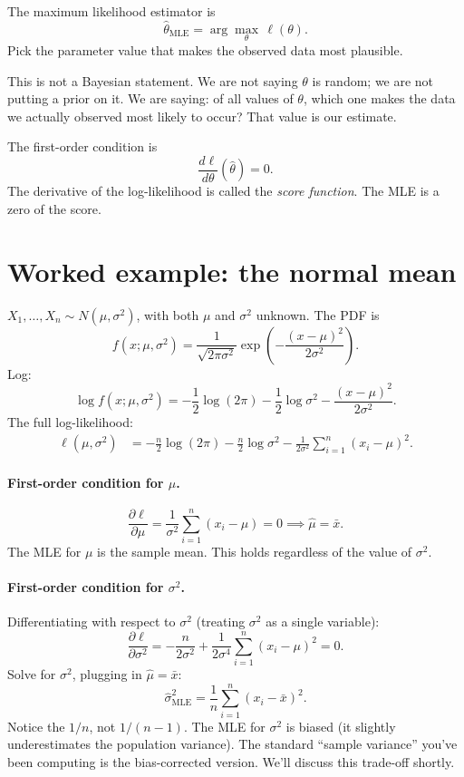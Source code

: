 The maximum likelihood estimator is
\begin{equation}
  \hat\theta_{\text{MLE}} = \arg\max_\theta \, \ell(\theta).
\end{equation}
Pick the parameter value that makes the observed data most plausible.

This is not a Bayesian statement. We are not saying $\theta$ is random; we are not putting a prior on it. We are saying: of all values of $\theta$, which one makes the data we actually observed most likely to occur? That value is our estimate.

The first-order condition is
\begin{equation}
  \frac{d\ell}{d\theta}(\hat\theta) = 0.
  \label{eq:score-equation}
\end{equation}
The derivative of the log-likelihood is called the \emph{score function}. The MLE is a zero of the score.

\section{Worked example: the normal mean}

$X_1, \ldots, X_n \sim N(\mu, \sigma^2)$, with both $\mu$ and $\sigma^2$ unknown. The PDF is
\[
  f(x; \mu, \sigma^2) = \frac{1}{\sqrt{2\pi\sigma^2}} \exp\!\left(-\frac{(x - \mu)^2}{2\sigma^2}\right).
\]
Log:
\[
  \log f(x; \mu, \sigma^2) = -\frac{1}{2}\log(2\pi) - \frac{1}{2}\log\sigma^2 - \frac{(x - \mu)^2}{2\sigma^2}.
\]
The full log-likelihood:
\begin{align}
  \ell(\mu, \sigma^2)
    &= -\frac{n}{2}\log(2\pi) - \frac{n}{2}\log\sigma^2 - \frac{1}{2\sigma^2}\sum_{i=1}^{n}(x_i - \mu)^2.
\end{align}

\paragraph{First-order condition for $\mu$.}
\[
  \frac{\partial \ell}{\partial \mu} = \frac{1}{\sigma^2}\sum_{i=1}^{n}(x_i - \mu) = 0 \implies \hat\mu = \bar{x}.
\]
The MLE for $\mu$ is the sample mean. This holds regardless of the value of $\sigma^2$.

\paragraph{First-order condition for $\sigma^2$.} Differentiating with respect to $\sigma^2$ (treating $\sigma^2$ as a single variable):
\[
  \frac{\partial \ell}{\partial \sigma^2} = -\frac{n}{2\sigma^2} + \frac{1}{2\sigma^4}\sum_{i=1}^{n}(x_i - \mu)^2 = 0.
\]
Solve for $\sigma^2$, plugging in $\hat\mu = \bar{x}$:
\[
  \hat\sigma^2_{\text{MLE}} = \frac{1}{n}\sum_{i=1}^{n}(x_i - \bar{x})^2.
\]
Notice the $1/n$, not $1/(n-1)$. The MLE for $\sigma^2$ is biased (it slightly underestimates the population variance). The standard ``sample variance'' you've been computing is the bias-corrected version. We'll discuss this trade-off shortly.

